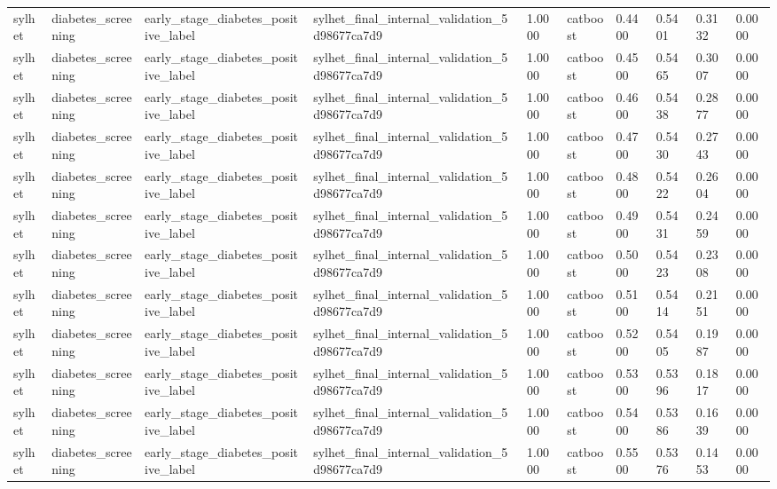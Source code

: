 \begin{tabular}{llllllllll}
sylhet & diabetes\_screening & early\_stage\_diabetes\_positive\_label & sylhet\_final\_internal\_validation\_5d98677ca7d9 & 1.0000 & catboost & 0.4400 & 0.5401 & 0.3132 & 0.0000 \\
sylhet & diabetes\_screening & early\_stage\_diabetes\_positive\_label & sylhet\_final\_internal\_validation\_5d98677ca7d9 & 1.0000 & catboost & 0.4500 & 0.5465 & 0.3007 & 0.0000 \\
sylhet & diabetes\_screening & early\_stage\_diabetes\_positive\_label & sylhet\_final\_internal\_validation\_5d98677ca7d9 & 1.0000 & catboost & 0.4600 & 0.5438 & 0.2877 & 0.0000 \\
sylhet & diabetes\_screening & early\_stage\_diabetes\_positive\_label & sylhet\_final\_internal\_validation\_5d98677ca7d9 & 1.0000 & catboost & 0.4700 & 0.5430 & 0.2743 & 0.0000 \\
sylhet & diabetes\_screening & early\_stage\_diabetes\_positive\_label & sylhet\_final\_internal\_validation\_5d98677ca7d9 & 1.0000 & catboost & 0.4800 & 0.5422 & 0.2604 & 0.0000 \\
sylhet & diabetes\_screening & early\_stage\_diabetes\_positive\_label & sylhet\_final\_internal\_validation\_5d98677ca7d9 & 1.0000 & catboost & 0.4900 & 0.5431 & 0.2459 & 0.0000 \\
sylhet & diabetes\_screening & early\_stage\_diabetes\_positive\_label & sylhet\_final\_internal\_validation\_5d98677ca7d9 & 1.0000 & catboost & 0.5000 & 0.5423 & 0.2308 & 0.0000 \\
sylhet & diabetes\_screening & early\_stage\_diabetes\_positive\_label & sylhet\_final\_internal\_validation\_5d98677ca7d9 & 1.0000 & catboost & 0.5100 & 0.5414 & 0.2151 & 0.0000 \\
sylhet & diabetes\_screening & early\_stage\_diabetes\_positive\_label & sylhet\_final\_internal\_validation\_5d98677ca7d9 & 1.0000 & catboost & 0.5200 & 0.5405 & 0.1987 & 0.0000 \\
sylhet & diabetes\_screening & early\_stage\_diabetes\_positive\_label & sylhet\_final\_internal\_validation\_5d98677ca7d9 & 1.0000 & catboost & 0.5300 & 0.5396 & 0.1817 & 0.0000 \\
sylhet & diabetes\_screening & early\_stage\_diabetes\_positive\_label & sylhet\_final\_internal\_validation\_5d98677ca7d9 & 1.0000 & catboost & 0.5400 & 0.5386 & 0.1639 & 0.0000 \\
sylhet & diabetes\_screening & early\_stage\_diabetes\_positive\_label & sylhet\_final\_internal\_validation\_5d98677ca7d9 & 1.0000 & catboost & 0.5500 & 0.5376 & 0.1453 & 0.0000 \\

\end{tabular}
